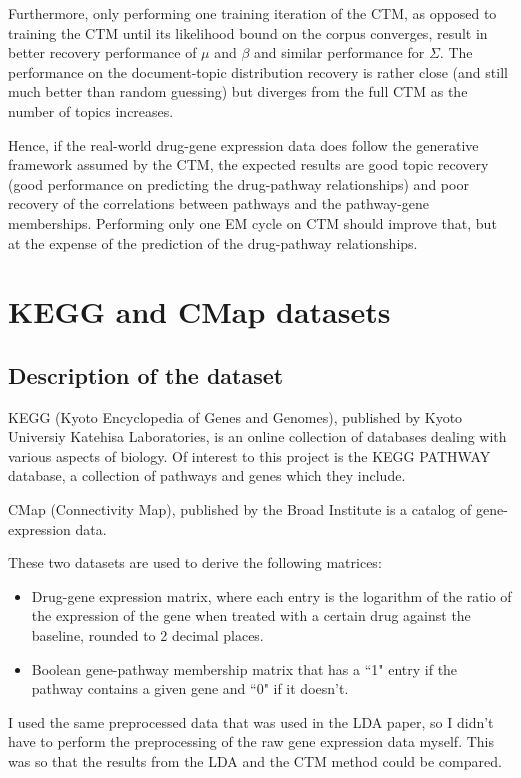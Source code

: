 \documentclass[12pt,a4paper,twoside,openright]{report}
\begin{document}
Furthermore, only performing one training iteration of the CTM, as opposed to training the CTM until its likelihood bound on the corpus converges, result in better recovery performance of $\mu$ and $\beta$ and similar performance for $\Sigma$. The performance on the document-topic distribution recovery is rather close (and still much better than random guessing) but diverges from the full CTM as the number of topics increases.

Hence, if the real-world drug-gene expression data does follow the generative framework assumed by the CTM, the expected results are good topic recovery (good performance on predicting the drug-pathway relationships) and poor recovery of the correlations between pathways and the pathway-gene memberships. Performing only one EM cycle on CTM should improve that, but at the expense of the prediction of the drug-pathway relationships.

\section{KEGG and CMap datasets}

\subsection{Description of the dataset}

KEGG (Kyoto Encyclopedia of Genes and Genomes), published by Kyoto Universiy Katehisa Laboratories, is an online collection of databases dealing with various aspects of biology. Of interest to this project is the KEGG PATHWAY database, a collection of pathways and genes which they include.

CMap (Connectivity Map), published by the Broad Institute is a catalog of gene-expression data.

These two datasets are used to derive the following matrices:

\begin{itemize}[noitemsep]
\item Drug-gene expression matrix, where each entry is the logarithm of the ratio of the expression of the gene when treated with a certain drug against the baseline, rounded to 2 decimal places.
\item Boolean gene-pathway membership matrix that has a ``1" entry if the pathway contains a given gene and ``0" if it doesn't.
\end{itemize}

I used the same preprocessed data that was used in the LDA paper, so I didn't have to perform the preprocessing of the raw gene expression data myself. This was so that the results from the LDA and the CTM method could be compared.
\end{document}
